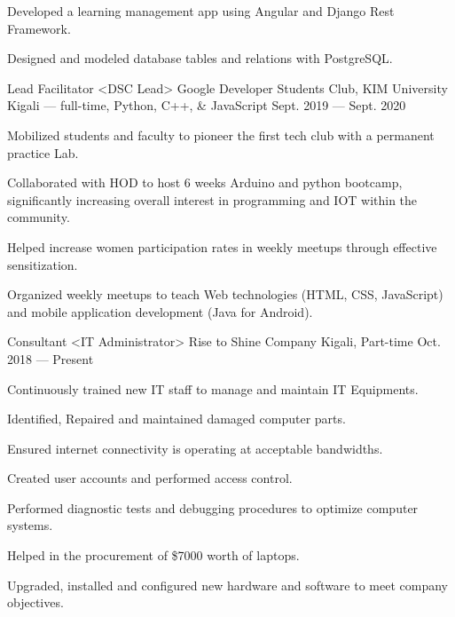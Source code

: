 \begin{cventries}
{\begin{cvitems}
        \item {Developed a learning management app using Angular and Django Rest Framework.}
        \item {Designed and modeled database tables and relations with PostgreSQL.}
      \end{cvitems}
    }
  \cventry
    {Lead Facilitator <DSC Lead>}
    {Google Developer Students Club, KIM University}
    {Kigali --- full-time, Python, C++, \& JavaScript}
    {Sept. 2019 --- Sept. 2020}
    {
      \begin{cvitems}
        \item{Mobilized students and faculty to pioneer the first tech club with a permanent practice Lab.}
        \item {Collaborated with HOD to host 6 weeks Arduino and python bootcamp, significantly increasing overall interest in programming and IOT within the community.}
        \item {Helped increase women participation rates in weekly meetups through effective sensitization.}
        \item {Organized weekly meetups to teach Web technologies (HTML, CSS, JavaScript) and mobile application development (Java for Android).}
      \end{cvitems}
    }
  \cventry
    {Consultant <IT Administrator>}
    {Rise to Shine Company}
    {Kigali, Part-time}
    {Oct. 2018 --- Present}
    {
      \begin{cvitems}
        \item {Continuously trained new IT staff to manage and maintain IT Equipments.}
        \item {Identified, Repaired and maintained damaged computer parts.}
        \item {Ensured internet connectivity is operating at acceptable bandwidths.}
        \item {Created user accounts and performed access control.}
        \item {Performed diagnostic tests and debugging procedures to optimize computer systems.}
        \item {Helped in the procurement of \$7000 worth of laptops.}
        \item {Upgraded, installed and configured new hardware and software to meet company objectives.}
      \end{cvitems}
    }
  \end{cventries}
